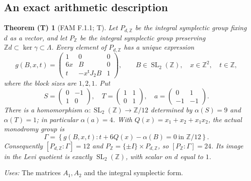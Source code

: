 \documentclass[11pt,a4paper]{article}
\theoremstyle{plain}
\newtheorem{theorem}{Theorem (T)}[section]
\theoremstyle{definition}
\begin{document}
\subsection{An exact arithmetic description}
\begin{theorem}[FAM F.1.1; T]\label{fam:F.1.1}
Let $P_{d,\mathbb Z}$ be the integral symplectic group fixing $d$ as a
vector, and let $P_{\mathbb Z}$ be the integral symplectic group preserving
$\mathbb Zd\subset\ker\gamma\subset\Lambda$.  Every element of
$P_{d,\mathbb Z}$ has a unique expression
\begin{equation}\label{fam:eq:F-g}
 g(B,x,t)=
 \begin{pmatrix}
 1&0&0\\6x&B&0\\t&-x^{\mathsf t}J_2B&1
 \end{pmatrix},\qquad
 B\in\operatorname{SL}_2(\mathbb Z),\quad x\in\mathbb Z^2,\quad t\in\mathbb Z,
\end{equation}
where the block sizes are $1,2,1$.  Put
\[
 S=\begin{pmatrix}0&-1\\1&0\end{pmatrix},\quad
 T=\begin{pmatrix}1&1\\0&1\end{pmatrix},\quad
 a=\begin{pmatrix}0&1\\-1&-1\end{pmatrix}.
\]
There is a homomorphism
$\alpha:\operatorname{SL}_2(\mathbb Z)\to\mathbb Z/12$ determined by
$\alpha(S)=9$ and $\alpha(T)=1$; in particular $\alpha(a)=4$.
With $Q(x)=x_1+x_2+x_1x_2$, the actual monodromy group is
\begin{equation}\label{fam:eq:F-Gamma}
 \Gamma=\left\{g(B,x,t):t+6Q(x)-\alpha(B)=0\ \text{in }\mathbb Z/12\right\}.
\end{equation}
Consequently $[P_{d,\mathbb Z}:\Gamma]=12$ and
$P_{\mathbb Z}=\{\pm I\}\times P_{d,\mathbb Z}$, so
$[P_{\mathbb Z}:\Gamma]=24$.  Its image in the Levi quotient is exactly
$\operatorname{SL}_2(\mathbb Z)$, with scalar on $d$ equal to $1$.
\end{theorem}
\noindent\emph{Uses:} The matrices $A_1,A_2$ and the integral symplectic form.\par
\end{document}
